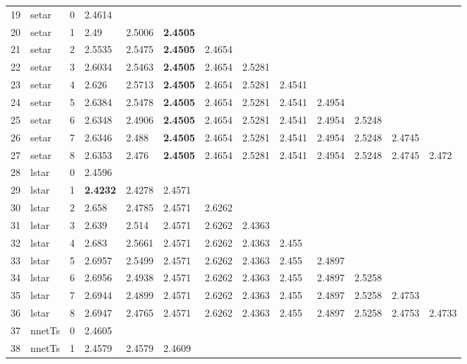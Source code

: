 \documentclass[10pt,a4paper]{article}
\begin{document}
\begin{table}[ht]
\begin{tabular}{rlrllllllllll}
   \hline
19 & setar &     0 & 2.4614 &  &  &  &  &  &  &  &  &  \\ 
  20 & setar &     1 & 2.49 & 2.5006 & \textbf{2.4505} &  &  &  &  &  &  &  \\ 
  21 & setar &     2 & 2.5535 & 2.5475 & \textbf{2.4505} & 2.4654 &  &  &  &  &  &  \\ 
  22 & setar &     3 & 2.6034 & 2.5463 & \textbf{2.4505} & 2.4654 & 2.5281 &  &  &  &  &  \\ 
  23 & setar &     4 & 2.626 & 2.5713 & \textbf{2.4505} & 2.4654 & 2.5281 & 2.4541 &  &  &  &  \\ 
  24 & setar &     5 & 2.6384 & 2.5478 & \textbf{2.4505} & 2.4654 & 2.5281 & 2.4541 & 2.4954 &  &  &  \\ 
  25 & setar &     6 & 2.6348 & 2.4906 & \textbf{2.4505} & 2.4654 & 2.5281 & 2.4541 & 2.4954 & 2.5248 &  &  \\ 
  26 & setar &     7 & 2.6346 & 2.488 & \textbf{2.4505} & 2.4654 & 2.5281 & 2.4541 & 2.4954 & 2.5248 & 2.4745 &  \\ 
  27 & setar &     8 & 2.6353 & 2.476 & \textbf{2.4505} & 2.4654 & 2.5281 & 2.4541 & 2.4954 & 2.5248 & 2.4745 & 2.472 \\ 
   \hline
28 & lstar &     0 & 2.4596 &  &  &  &  &  &  &  &  &  \\ 
  29 & lstar &     1 & \textbf{2.4232} & 2.4278 & 2.4571 &  &  &  &  &  &  &  \\ 
  30 & lstar &     2 & 2.658 & 2.4785 & 2.4571 & 2.6262 &  &  &  &  &  &  \\ 
  31 & lstar &     3 & 2.639 & 2.514 & 2.4571 & 2.6262 & 2.4363 &  &  &  &  &  \\ 
  32 & lstar &     4 & 2.683 & 2.5661 & 2.4571 & 2.6262 & 2.4363 & 2.455 &  &  &  &  \\ 
  33 & lstar &     5 & 2.6957 & 2.5499 & 2.4571 & 2.6262 & 2.4363 & 2.455 & 2.4897 &  &  &  \\ 
  34 & lstar &     6 & 2.6956 & 2.4938 & 2.4571 & 2.6262 & 2.4363 & 2.455 & 2.4897 & 2.5258 &  &  \\ 
  35 & lstar &     7 & 2.6944 & 2.4899 & 2.4571 & 2.6262 & 2.4363 & 2.455 & 2.4897 & 2.5258 & 2.4753 &  \\ 
  36 & lstar &     8 & 2.6947 & 2.4765 & 2.4571 & 2.6262 & 2.4363 & 2.455 & 2.4897 & 2.5258 & 2.4753 & 2.4733 \\ 
   \hline
37 & nnetTs &     0 & 2.4605 &  &  &  &  &  &  &  &  &  \\ 
  38 & nnetTs &     1 & 2.4579 & 2.4579 & 2.4609 &  &  &  &  &  &  &  \\ 

\end{tabular}
\end{table}
\end{document}
